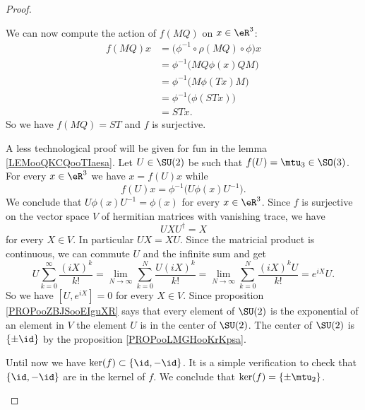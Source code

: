 \begin{proof}
\begin{subproof}
\begin{subproof}
			We can now compute the action of \( f(MQ)\) on \( x\in \eR^3\):
			\begin{subequations}
				\begin{align}
					f(MQ)x & =\big( \phi^{-1}\circ\rho(MQ)\circ\phi \big)x \\
					       & =\phi^{-1}\big( MQ\phi(x)QM \big)             \\
					       & =\phi^{-1}\big( M\phi(Tx)M \big)              \\
					       & =\phi^{-1}\big( \phi(STx) \big)               \\
					       & =STx.
				\end{align}
			\end{subequations}
			So we have \( f(MQ)=ST\) and \( f\) is surjective.
		\end{subproof}
		\spitem[Kernel]
		A less technological proof will be given for fun in the lemma \ref{LEMooQKCQooTIaesa}.
		Let \( U\in \SU(2)\) be such that \( f(U)=\mtu_3\in \SO(3)\). For every \( x\in \eR^3\) we have \( x=f(U)x\) while
		\begin{equation}
			f(U)x=\phi^{-1}\big( U\phi(x)U^{-1} \big).
		\end{equation}
		We conclude that \( U\phi(x)U^{-1}=\phi(x)\) for every \( x\in \eR^3\). Since \( f\) is surjective on the vector space \( V\) of hermitian matrices with vanishing trace, we have
		\begin{equation}
			UXU^{\dag}=X
		\end{equation}
		for every \( X\in V\). In particular \( UX=XU\). Since the matricial product is continuous, we can commute \( U\) and the infinite sum and get
		\begin{equation}
			U\sum_{k=0}^{\infty}\frac{ (iX)^k }{ k! }=\lim_{N\to \infty} \sum_{k=0}^N\frac{ U(iX)^k }{ k! }=\lim_{N\to \infty} \sum_{k=0}^N\frac{ (iX)^kU }{ k! }= e^{iX}U.
		\end{equation}
		So we have \( [U, e^{iX}]=0\) for every \( X\in V\). Since proposition \ref{PROPooZBJSooEIguXR} says that every element of \( \SU(2)\) is the exponential of an element in \( V\) the element \( U\) is in the center of \( \SU(2)\). The center of \( \SU(2)\) is \( \{ \pm\id \}\) by the proposition \ref{PROPooLMGHooKrKpsa}.

		Until now we have \( \ker(f)\subset \{ \id,-\id \}\). It is a simple verification to check that \( \{ \id,-\id \}\) are in the kernel of \( f\). We conclude that \( \ker(f)=\{ \pm\mtu_2 \}\).
	\end{subproof}
\end{proof}

